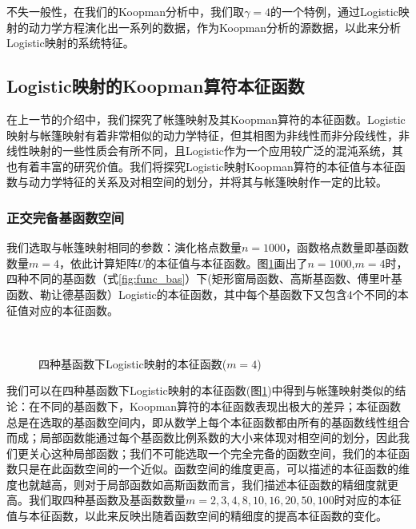 不失一般性，在我们的Koopman分析中，我们取$\gamma=4$的一个特例，通过Logistic映射的动力学方程演化出一系列的数据，作为Koopman分析的源数据，以此来分析Logistic映射的系统特征。

\subsection{Logistic映射的Koopman算符本征函数}
在上一节的介绍中，我们探究了帐篷映射及其Koopman算符的本征函数。Logistic映射与帐篷映射有着非常相似的动力学特征，但其相图为非线性而非分段线性，非线性映射的一些性质会有所不同，且Logistic作为一个应用较广泛的混沌系统，其也有着丰富的研究价值。我们将探究Logistic映射Koopman算符的本征值与本征函数与动力学特征的关系及对相空间的划分，并将其与帐篷映射作一定的比较。

\subsubsection{正交完备基函数空间}

我们选取与帐篷映射相同的参数：演化格点数量$n=1000$，函数格点数量即基函数数量$m=4$，依此计算矩阵$U$的本征值与本征函数。图\ref{fig:logi_eig_RGFL}画出了$n=1000$,$m=4$时，四种不同的基函数（式\ref{fig:func_bas}）下(矩形窗局函数、高斯基函数、傅里叶基函数、勒让德基函数）Logistic的本征函数，其中每个基函数下又包含4个不同的本征值对应的本征函数。

\begin{figure}[!]
    \centering
      \\
    \caption{四种基函数下Logistic映射的本征函数($m=4$)}\label{fig:logi_eig_RGFL}
\end{figure}

我们可以在四种基函数下Logistic映射的本征函数(图\ref{fig:logi_eig_RGFL})中得到与帐篷映射类似的结论：在不同的基函数下，Koopman算符的本征函数表现出极大的差异；本征函数总是在选取的基函数空间内，即从数学上每个本征函数都由所有的基函数线性组合而成；局部函数能通过每个基函数比例系数的大小来体现对相空间的划分，因此我们更关心这种局部函数；我们不可能选取一个完全完备的函数空间，我们的本征函数只是在此函数空间的一个近似。函数空间的维度更高，可以描述的本征函数的维度也就越高，则对于局部函数如高斯函数而言，我们描述本征函数的精细度就更高。我们取四种基函数及基函数数量$m=2,3,4,8,10,16,20,50,100$时对应的本征值与本征函数，以此来反映出随着函数空间的精细度的提高本征函数的变化。

